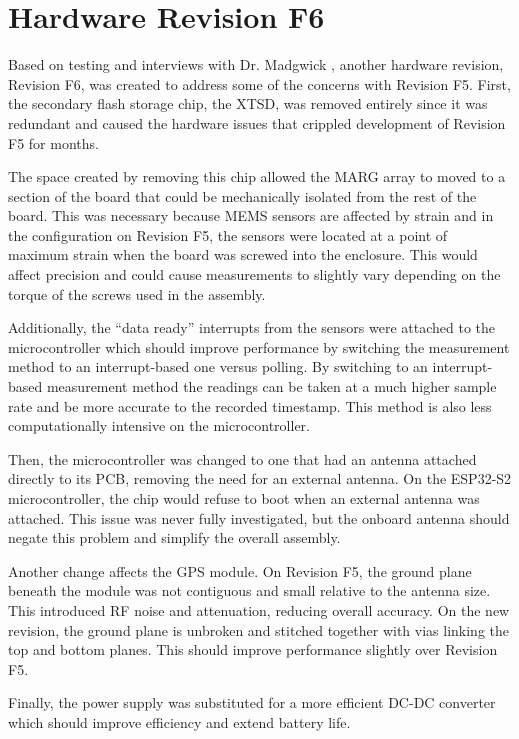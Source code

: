 \section{Hardware Revision F6} 
Based on testing and interviews with Dr. Madgwick \cite{Duffy:2023}, another hardware revision, Revision F6, was created to address some of the concerns with Revision F5.
First, the secondary flash storage chip, the XTSD, was removed entirely since it was redundant and caused the hardware issues that crippled development of Revision F5 for months.

The space created by removing this chip allowed the MARG array to moved to a section of the board that could be mechanically isolated from the rest of the board.
This was necessary because MEMS sensors are affected by strain and in the configuration on Revision F5, the sensors were located at a point of maximum strain when the board was screwed into the enclosure.
This would affect precision and could cause measurements to slightly vary depending on the torque of the screws used in the assembly.

Additionally, the ``data ready'' interrupts from the sensors were attached to the microcontroller which should improve performance by switching the measurement method to an interrupt-based one versus polling.
By switching to an interrupt-based measurement method the readings can be taken at a much higher sample rate and be more accurate to the recorded timestamp.
This method is also less computationally intensive on the microcontroller.

Then, the microcontroller was changed to one that had an antenna attached directly to its PCB, removing the need for an external antenna.
On the ESP32-S2 microcontroller, the chip would refuse to boot when an external antenna was attached.
This issue was never fully investigated, but the onboard antenna should negate this problem and simplify the overall assembly.

Another change affects the GPS module.
On Revision F5, the ground plane beneath the module was not contiguous and small relative to the antenna size.
This introduced RF noise and attenuation, reducing overall accuracy.
On the new revision, the ground plane is unbroken and stitched together with vias linking the top and bottom planes.
This should improve performance slightly over Revision F5.

Finally, the power supply was substituted for a more efficient DC-DC converter which should improve efficiency and extend battery life.

